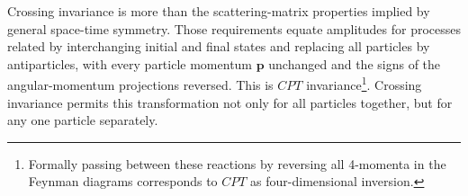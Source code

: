 Crossing invariance is more than the scattering-matrix properties implied by general space-time symmetry. Those requirements equate amplitudes for processes related by interchanging initial and final states and replacing all particles by antiparticles, with every particle momentum $\mathbf p$ unchanged and the signs of the angular-momentum projections reversed. This is $CPT$ invariance\footnote{Formally passing between these reactions by reversing all 4-momenta in the Feynman diagrams corresponds to $CPT$ as four-dimensional inversion.}. Crossing invariance permits this transformation not only for all particles together, but for any one particle separately.
